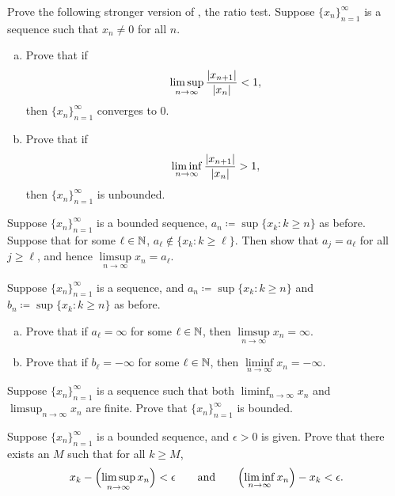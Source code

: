 \begin{exercise} \label{exercise:strongerratiotest2}
Prove the following stronger version of , the ratio
test.
Suppose $\{ x_n \}_{n=1}^\infty$ is a sequence such that $x_n \not= 0$ for all
$n$.
\begin{enumerate}[a)]
\item
Prove that if
\begin{equation*}
\limsup_{n \to \infty} \frac{\left\lvert {x_{n+1}} \right\rvert}{\left\lvert {x_n} \right\rvert} < 1 ,
\end{equation*}
then $\{ x_n \}_{n=1}^\infty$ converges to $0$.
\item
Prove that if
\begin{equation*}
\liminf_{n \to \infty} \frac{\left\lvert {x_{n+1}} \right\rvert}{\left\lvert {x_n} \right\rvert} > 1 ,
\end{equation*}
then $\{ x_n \}_{n=1}^\infty$ is unbounded.
\end{enumerate}
\end{exercise}

\begin{exercise}
Suppose $\{ x_n \}_{n=1}^\infty$ is a bounded sequence, $a_n \coloneqq \sup \{ x_k : k \geq n \}$
as before.  Suppose that for some $\ell \in {\mathbb{N}}$,
$a_\ell \notin \{ x_k : k \geq \ell \}$.  Then show that $a_j = a_\ell$ for all $j \geq \ell$, and hence
$\limsup\limits_{n\to\infty} x_n = a_\ell$.
\end{exercise}

\begin{exercise}
Suppose $\{ x_n \}_{n=1}^\infty$ is a sequence,
and $a_n \coloneqq \sup \{ x_k : k \geq n \}$ and
$b_n \coloneqq \sup \{ x_k : k \geq n \}$ as before.
\begin{enumerate}[a)]
\item
Prove that if $a_\ell = \infty$ for some $\ell \in {\mathbb{N}}$, then 
$\limsup\limits_{n\to\infty} x_n = \infty$.
\item
Prove that if $b_\ell = -\infty$ for some $\ell \in {\mathbb{N}}$, then 
$\liminf\limits_{n\to\infty} x_n = -\infty$.
\end{enumerate}
\end{exercise}

\begin{exercise}
Suppose $\{ x_n \}_{n=1}^\infty$ is a sequence
such that both $\liminf_{n\to\infty} x_n$ and
$\limsup_{n\to\infty} x_n$  are finite.  Prove that $\{ x_n \}_{n=1}^\infty$ is bounded.
\end{exercise}

\begin{exercise}
Suppose $\{ x_n \}_{n=1}^\infty$ is a bounded sequence, and $\epsilon > 0$ is given.
Prove that there exists an $M$ such that for all $k \geq M$,
\begin{equation*}
x_k - \Bigl(\limsup_{n\to\infty} x_n\Bigr) < \epsilon \qquad \text{and} \qquad
\Bigl(\liminf_{n\to\infty} x_n\Bigr) - x_k < \epsilon .
\end{equation*}
\end{exercise}

